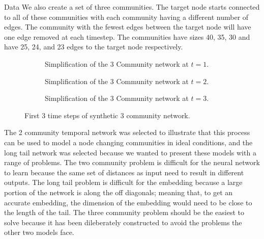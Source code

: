 \documentclass{article}
\begin{document}
\begin{section}{Data}
    We also create a set of three communities. The target node starts connected to all of these communities with each community having a different number of edges. The community with the fewest edges between the target node will have one edge removed at each timestep. The communities have sizes 40, 35, 30 and have 25, 24, and 23 edges to the target node respectively. 
    \begin{figure}[H]
        \centering
        \centering
        \begin{subfigure}[c]{0.3\textwidth}
            \centering
            \resizebox{.6\width}{!}{}
            \caption{Simplification of the 3 Community network at $t=1$.}
        \end{subfigure}
        \hfill
        \centering
        \begin{subfigure}[c]{0.3\textwidth}
            \centering
            \resizebox{.6\width}{!}{}
            \caption{Simplification of the 3 Community network at $t=2$.}
        \end{subfigure}
        \hfill
        \centering
        \begin{subfigure}[c]{0.3\textwidth}
            \centering
            \resizebox{.6\width}{!}{}
            \caption{Simplification of the 3 Community network at $t=3$.}
        \end{subfigure}
        \caption{First 3 time steps of synthetic 3 community network.}
        \label{3community train series}
    \end{figure}
    The 2 community temporal network was selected to illustrate that this process can be used to model a node changing communities in ideal conditions, and the long tail network was selected because we wanted to present these models with a range of problems. The two community problem is difficult for the neural network to learn because the same set of distances as input need to result in different outputs. The long tail problem is difficult for the embedding because a large portion of the network is along the off diagonals; meaning that, to get an accurate embedding, the dimension of the embedding would need to be close to the length of the tail. The three community problem should be the easiest to solve because it has been dileberately constructed to avoid the problems the other two models face.

\end{section}
\end{document}
